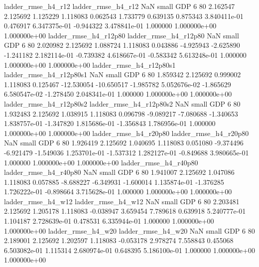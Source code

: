       ladder_rmse_h4_r12       ladder_rmse_h4_r12                   NaN      small      GDP                 6 80 2.162547       2.125692 1.125229       1.118083    0.062543      1.733779      0.639135     0.875343   3.840411e-01  0.476917 6.347375e-01    -0.944322   3.478841e-01            1.000000    1.000000e+00        1.000000e+00
   ladder_rmse_h4_r12p80    ladder_rmse_h4_r12p80                   NaN      small      GDP                 6 80 2.020982       2.125692 1.088724       1.118083    0.043886     -4.925943     -2.625890    -1.241182   2.182114e-01 -0.739382 4.618667e-01    -0.583342   5.613248e-01            1.000000    1.000000e+00        1.000000e+00
 ladder_rmse_h4_r12p80s1  ladder_rmse_h4_r12p80s1                   NaN      small      GDP                 6 80 1.859342       2.125692 0.999002       1.118083    0.125467    -12.530054    -10.650517    -1.985782   5.052676e-02 -1.865629 6.580547e-02    -1.278450   2.048341e-01            1.000000    1.000000e+00        1.000000e+00
 ladder_rmse_h4_r12p80s2  ladder_rmse_h4_r12p80s2                   NaN      small      GDP                 6 80 1.932483       2.125692 1.038915       1.118083    0.096798     -9.089217     -7.080688    -1.340653   1.838757e-01 -1.347820 1.815686e-01    -1.356843   1.786956e-01            1.000000    1.000000e+00        1.000000e+00
   ladder_rmse_h4_r20p80    ladder_rmse_h4_r20p80                   NaN      small      GDP                 6 80 1.926419       2.125692 1.040695       1.118083    0.051080     -9.374496     -6.921479    -1.549036   1.253701e-01 -1.537312 1.282127e-01    -0.849688   3.980665e-01            1.000000    1.000000e+00        1.000000e+00
   ladder_rmse_h4_r40p80    ladder_rmse_h4_r40p80                   NaN      small      GDP                 6 80 1.941007       2.125692 1.047086       1.118083    0.057885     -8.688227     -6.349931    -1.600014   1.135874e-01 -1.376285 1.726222e-01    -0.898664   3.715628e-01            1.000000    1.000000e+00        1.000000e+00
      ladder_rmse_h4_w12       ladder_rmse_h4_w12                   NaN      small      GDP                 6 80 2.203481       2.125692 1.205178       1.118083   -0.038947      3.659454      7.789618     0.639918   5.240777e-01  1.104187 2.728639e-01     0.478531   6.335944e-01            1.000000    1.000000e+00        1.000000e+00
      ladder_rmse_h4_w20       ladder_rmse_h4_w20                   NaN      small      GDP                 6 80 2.189001       2.125692 1.202597       1.118083   -0.053178      2.978274      7.558843     0.455068   6.503082e-01  1.115314 2.680974e-01     0.648395   5.186100e-01            1.000000    1.000000e+00        1.000000e+00
